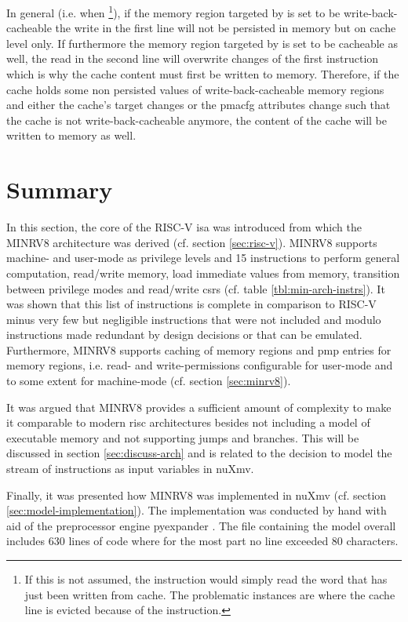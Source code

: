In general (i.e. when \footnote{%
    If this is not assumed, the  instruction would simply read the word that has just been written from cache.
    The problematic instances are where the cache line is evicted because of the  instruction.
}), if the memory region targeted by  is set to be write-back-cacheable the write in the first line will not be persisted in memory but on cache level only.
If furthermore the memory region targeted by  is set to be cacheable as well, the read in the second line will overwrite changes of the first instruction which is why the cache content must first be written to memory.
Therefore, if the cache holds some non persisted values of write-back-cacheable memory regions and either the cache's target changes or the \gls{pmacfg} attributes change such that the cache is not write-back-cacheable anymore, the content of the cache will be written to memory as well.

\section{Summary}
\label{sec:arch-summary}

In this section, the core of the RISC-V \gls{isa} was introduced from which the MINRV8 architecture was derived (cf. section \ref{sec:risc-v}).
MINRV8 supports machine- and user-mode as privilege levels and 15 instructions to perform general computation, read/write memory, load immediate values from memory, transition between privilege modes and read/write \glspl{csr} (cf. table \ref{tbl:min-arch-instrs}).
It was shown that this list of instructions is complete in comparison to RISC-V minus very few but negligible instructions that were not included and modulo instructions made redundant by design decisions or that can be emulated.
Furthermore, MINRV8 supports caching of memory regions and \gls{pmp} entries for memory regions, i.e. read- and write-permissions configurable for user-mode and to some extent for machine-mode (cf. section \ref{sec:minrv8}).

It was argued that MINRV8 provides a sufficient amount of complexity to make it comparable to modern \gls{risc} architectures besides not including a model of executable memory and not supporting jumps and branches.
This will be discussed in section \ref{sec:discuss-arch} and is related to the decision to model the stream of instructions as input variables in nuXmv.

Finally, it was presented how MINRV8 was implemented in nuXmv (cf. section \ref{sec:model-implementation}).
The implementation was conducted by hand with aid of the preprocessor engine pyexpander \cite{pyexpander}.
The file containing the model overall includes 630 lines of code where for the most part no line exceeded 80 characters.
